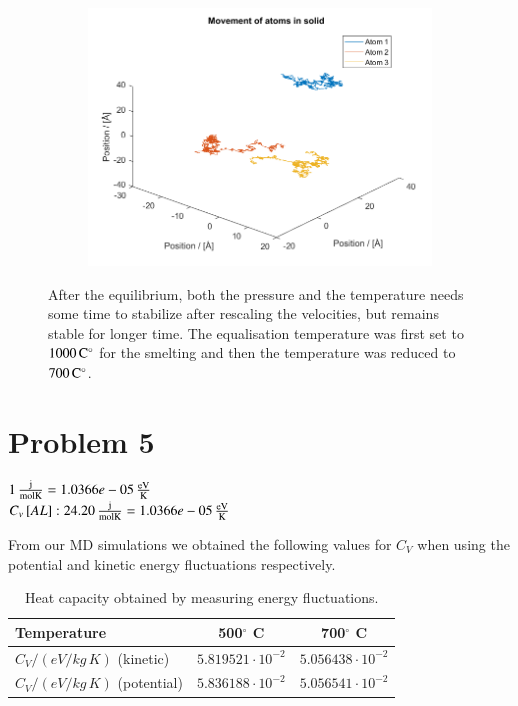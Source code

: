 \begin{figure}[H]
\begin{subfigure}[b]{0.40\textwidth}
        \includegraphics[width=\textwidth]{graphics/task4/traj.png}
    \end{subfigure}
    \caption{After the equilibrium, both the pressure and the temperature needs some time to stabilize after rescaling the velocities, but remains stable for longer time. The equalisation temperature was first set to $\unit[1000]{C^\circ}$ for the smelting and then the temperature was reduced to $\unit[700]{C^\circ}$.}
    \label{fig:equilibrium500}
\end{figure}


\section*{Problem 5}

$\unit[1]{\frac{j}{mol K}}=\unit[1.0366e-05]{\frac{eV}{K}}$ \\
$C_v\left[AL\right]:\unit[24.20]{\frac{j}{mol K}}=\unit[1.0366e-05]{\frac{eV}{K}}$

\noindent From our MD simulations we obtained the following values for $C_V$ when using the potential and kinetic energy fluctuations respectively.
\begin{table}[h!]
	\centering
	\caption{Heat capacity obtained by measuring energy fluctuations.}
	\begin{tabular}{l|cc}
		\hline \textbf{Temperature} & \textbf{500$^\circ$ C} & \textbf{700$^\circ$ C} \\ \hline
		$C_V / (\unit{eV/kg\,K})$ (kinetic) & $5.819521 \cdot 10^{-2}$ & $5.056438 \cdot 10^{-2}$ \\
		$C_V / (\unit{eV/kg\,K})$ (potential) & $5.836188 \cdot 10^{-2}$ & $5.056541 \cdot 10^{-2}$ \\ \hline
	\end{tabular}
	\label{tab:prob5}
\end{table}

